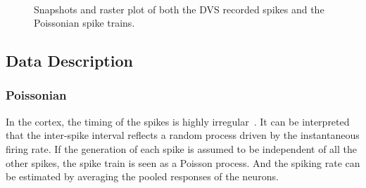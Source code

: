 \begin{figure}[hbt]
  \centering
  \\
  
  \caption{Snapshots and raster plot of both the DVS recorded spikes and the Poissonian spike trains.}
  \label{fig:zero}
\end{figure}

\subsection{Data Description}	
	\subsubsection{Poissonian}
	
	In the cortex, the timing of the spikes is highly irregular~\cite{squire1998findings}.
	It can be interpreted that the inter-spike interval reflects a random process driven by the instantaneous firing rate.
	If the generation of each spike is assumed to be independent of all the other spikes, the spike train is seen as a Poisson process.
	And the spiking rate can be estimated by averaging the pooled responses of the neurons.
		
